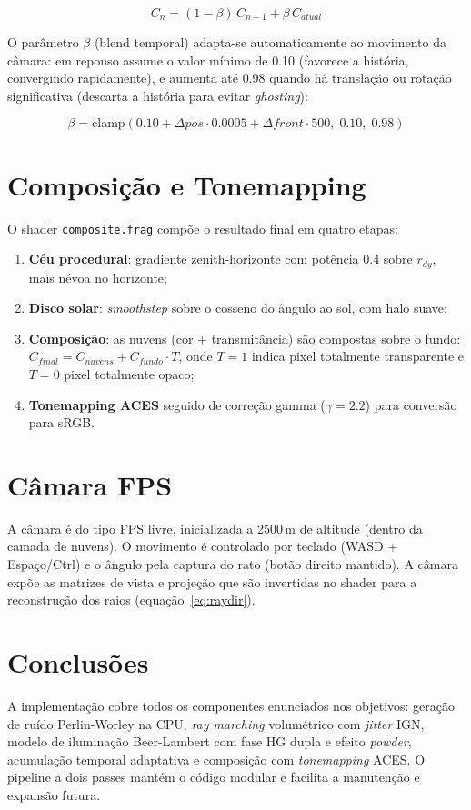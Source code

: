 \begin{equation}
C_n = (1 - \beta)\, C_{n-1} + \beta\, C_{atual}
\label{eq:taa}
\end{equation}

O parâmetro $\beta$ (blend temporal) adapta-se automaticamente ao movimento da câmara: em repouso assume o valor mínimo de 0.10 (favorece a história, convergindo rapidamente), e aumenta até 0.98 quando há translação ou rotação significativa (descarta a história para evitar \emph{ghosting}):

\begin{equation}
\beta = \text{clamp}(0.10 + \Delta pos \cdot 0.0005 + \Delta front \cdot 500,\; 0.10,\; 0.98)
\label{eq:taablend}
\end{equation}

\section{Composição e Tonemapping}
\label{chap4:sec:composite}

O shader \texttt{composite.frag} compõe o resultado final em quatro etapas:

\begin{enumerate}
    \item \textbf{Céu procedural}: gradiente zenith-horizonte com potência 0.4 sobre $r_{dy}$, mais névoa no horizonte;
    \item \textbf{Disco solar}: \emph{smoothstep} sobre o cosseno do ângulo ao sol, com halo suave;
    \item \textbf{Composição}: as nuvens (cor + transmitância) são compostas sobre o fundo: $C_{final} = C_{nuvens} + C_{fundo} \cdot T$, onde $T=1$ indica pixel totalmente transparente e $T=0$ pixel totalmente opaco;
    \item \textbf{Tonemapping ACES} seguido de correção gamma ($\gamma = 2.2$) para conversão para sRGB.
\end{enumerate}

\section{Câmara FPS}
\label{chap4:sec:camera}

A câmara é do tipo FPS livre, inicializada a 2500\,m de altitude (dentro da camada de nuvens). O movimento é controlado por teclado (WASD + Espaço/Ctrl) e o ângulo pela captura do rato (botão direito mantido). A câmara expõe as matrizes de vista e projeção que são invertidas no shader para a reconstrução dos raios (equação~\ref{eq:raydir}).

\section{Conclusões}
\label{chap4:sec:concs}

A implementação cobre todos os componentes enunciados nos objetivos: geração de ruído Perlin-Worley na \ac{CPU}, \emph{ray marching} volumétrico com \emph{jitter} IGN, modelo de iluminação Beer-Lambert com fase HG dupla e efeito \emph{powder}, acumulação temporal adaptativa e composição com \emph{tonemapping} ACES. O pipeline a dois passes mantém o código modular e facilita a manutenção e expansão futura.
